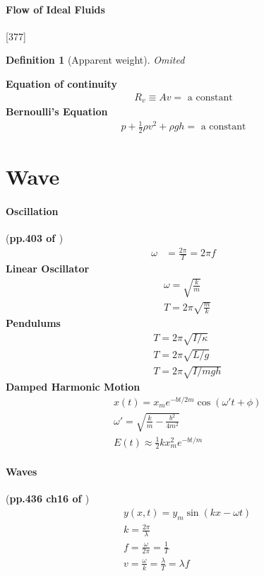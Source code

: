 \documentclass{article}
\numberwithin{equation}{subsection} %
\newtheorem{defi}{Definition}[section]
\theoremstyle{definition}
\begin{document}
\paragraph{Flow of Ideal Fluids}[377]
\begin{defi}[Apparent weight]
    Omited
\end{defi}

\textbf{Equation of continuity}
\begin{align}
    R_v \equiv Av = \text{ a constant}
\end{align}
\textbf{Bernoulli's Equation}
\begin{align}
    p + \frac{1}{2}\rho v^2 + \rho gh = \text{ a constant}
\end{align}

\section{Wave}
\label{sec:Wave}

\paragraph{Oscillation} (\textbf{pp.403 of \cite{book}})
\begin{align}
    \omega &= \frac{2\pi}{T} = 2\pi f
\end{align}
\textbf{Linear Oscillator}
\begin{align}
    & \omega = \sqrt{\frac{k}{m}} \\
    & T = 2\pi \sqrt{\frac{m}{k}} 
\end{align}
\textbf{Pendulums}
\begin{align}
    & T = 2\pi \sqrt{I/\kappa} \\
    & T = 2\pi \sqrt{L/g} \\
    & T = 2\pi \sqrt{I/mgh}
\end{align}
\textbf{Damped Harmonic Motion}
\begin{align}
    & x(t) = x_m e^{-bt/2m} \cos\left( \omega' t+\phi\right) \\
    & \omega' = \sqrt{ \frac{k}{m} - \frac{b^2}{4m^2} } \\
    & E(t)\approx \frac{1}{2} kx_m^2 e^{-bt/m}
\end{align}


\paragraph{Waves} (\textbf{pp.436 ch16 of \cite{book}})
\begin{align}
    & y(x,t) = y_m \sin(kx-\omega t) \\
    & k = \frac{2\pi}{\lambda} \\
    & f = \frac{\omega}{2\pi} = \frac{1}{T} \\
    & v = \frac{\omega}{k} = \frac{\lambda}{T} = \lambda f
\end{align}
\end{document}
